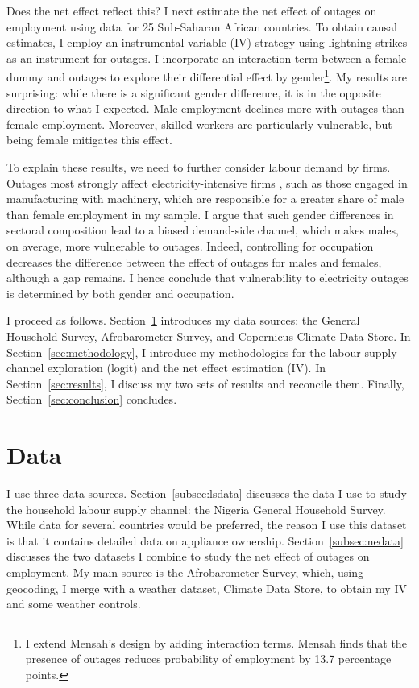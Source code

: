\documentclass[12pt]{article}
\begin{document}
\par
Does the net effect reflect this? I next estimate the net effect of outages on employment using data for 25 Sub-Saharan African countries. To obtain causal estimates, I employ an instrumental variable (IV) strategy using lightning strikes as an instrument for outages. I incorporate an interaction term between a female dummy and outages to explore their differential effect by gender\footnote{I extend Mensah’s \cite{mensah2024a} design by adding interaction terms. Mensah finds that the presence of outages reduces probability of employment by 13.7 percentage points.}. My results are surprising: while there is a significant gender difference, it is in the opposite direction to what I expected. Male employment declines more with outages than female employment. Moreover, skilled workers are particularly vulnerable, but being female mitigates this effect.
\par
To explain these results, we need to further consider labour demand by firms. Outages most strongly affect electricity-intensive firms \cite{alam2013a}, such as those engaged in manufacturing with machinery, which are responsible for a greater share of male than female employment in my sample. I argue that such gender differences in sectoral composition lead to a biased demand-side channel, which makes males, on average, more vulnerable to outages. Indeed, controlling for occupation decreases the difference between the effect of outages for males and females, although a gap remains. I hence conclude that vulnerability to electricity outages is determined by both gender and occupation.
\par
I proceed as follows. Section~\ref{sec:data} introduces my data sources: the General Household Survey, Afrobarometer Survey, and Copernicus Climate Data Store. In Section~\ref{sec:methodology}, I introduce my methodologies for the labour supply channel exploration (logit) and the net effect estimation (IV). In Section~\ref{sec:results}, I discuss my two sets of results and reconcile them. Finally, Section~\ref{sec:conclusion} concludes. 
\newpage
\section{Data} \label{sec:data}
I use three data sources. Section~\ref{subsec:lsdata} discusses the data I use to study the household labour supply channel: the Nigeria General Household Survey. While data for several countries would be preferred, the reason I use this dataset is that it contains detailed data on appliance ownership. Section~\ref{subsec:nedata} discusses the two datasets I combine to study the net effect of outages on employment. My main source is the Afrobarometer Survey, which, using geocoding, I merge with a weather dataset, Climate Data Store, to obtain my IV and some weather controls. 
\end{document}
